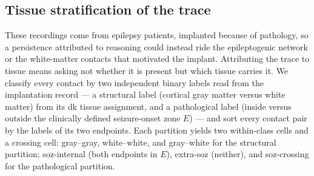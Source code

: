%
%

\subsection{Tissue stratification of the trace}
\label{ssec:methods_tissue}

These recordings come from epilepsy patients, implanted because of pathology, so a persistence attributed to reasoning could instead ride the epileptogenic network or the white-matter contacts that motivated the implant. Attributing the trace to tissue means asking not whether it is present but which tissue carries it. We classify every contact by two independent binary labels read from the implantation record --- a structural label (cortical gray matter versus white matter) from its \gls{dk} tissue assignment, and a pathological label (inside versus outside the clinically defined seizure-onset zone \(E\)) --- and sort every contact pair by the labels of its two endpoints. Each partition yields two within-class cells and a crossing cell: gray--gray, white--white, and gray--white for the structural partition; \gls{soz}-internal (both endpoints in \(E\)), extra-\gls{soz} (neither), and \gls{soz}-crossing for the pathological partition.

